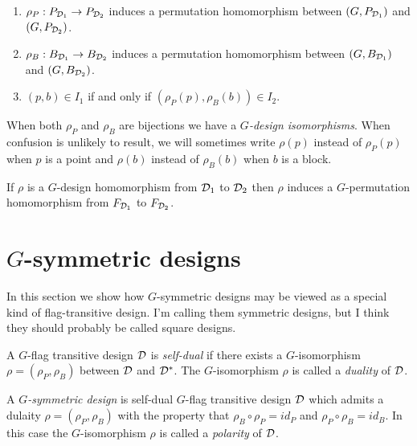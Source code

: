 \begin {enumerate}
\item $\rho_P : P_{\mathcal{D}_1} \to P_{\mathcal{D}_2}$ induces a permutation homomorphism between 
$(G,P_{\mathcal{D}_1})$ and $(G,P_{\mathcal{D}_2})$.
\item $\rho_B : B_{\mathcal{D}_1} \to B_{\mathcal{D}_2}$ induces a permutation homomorphism between 
$(G,B_{\mathcal{D}_1})$ and $(G,B_{\mathcal{D}_2})$.
\item $(p,b) \in I_1$ if and only if $(\rho_P(p), \rho_B(b)) \in I_2$.
\end{enumerate}

When both $\rho_P$ and $\rho_B$ are bijections we have a {\it $G$-design isomorphisms}.
When confusion is unlikely to result, 
we will sometimes write $\rho(p)$ instead of $\rho_P(p)$ when $p$ is a point
and $\rho(b)$ instead of $\rho_B(b)$ when $b$ is a block.

\begin{proposition}
If $\rho$ is a $G$-design homomorphism from $\mathcal{D}_1$ to $\mathcal{D}_2$
then $\rho$ induces a $G$-permutation homomorphism from $F_{\mathcal{D}_1}$ to $F_{\mathcal{D}_2}$.
\end{proposition}

\section{$G$-symmetric designs}

In this section we show how $G$-symmetric designs
may be viewed as a special kind of flag-transitive design.
I'm calling them symmetric designs, but I think
they should probably be called square designs.

\begin{definition}
A $G$-flag transitive design $\mathcal{D}$ is {\it self-dual}
if there exists a $G$-isomorphism $\rho = (\rho_P, \rho_B)$
between $\mathcal{D}$ and $\mathcal{D}^{*}$.
The $G$-isomorphism $\rho$ is called a {\it duality} of $\mathcal{D}$.
\end{definition}

\begin{definition}
A {\it $G$-symmetric design} is self-dual $G$-flag transitive design $\mathcal{D}$
which admits a dulaity $\rho = (\rho_P, \rho_B)$ with the property that
$\rho_B \circ \rho_P = id_P$ and $\rho_P \circ \rho_B = id_B$.
In this case the $G$-isomorphism $\rho$ is called a {\it polarity}
of $\mathcal{D}$.
\end{definition}

